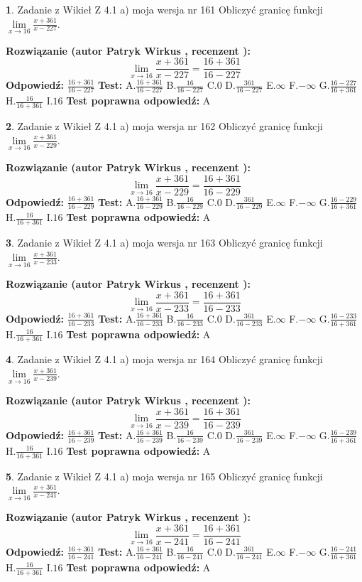 \documentclass[12pt, a4paper]{article}
\theoremstyle{definition} %
\newtheorem{zad}{}
\newcommand{\zadStart}[1]{\begin{zad}#1\newline}
\newcommand{\zadStop}{\end{zad}}
\newcommand{\rozwStart}[2]{\noindent \textbf{Rozwiązanie (autor #1 , recenzent #2): }\newline}
\newcommand{\rozwStop}{\newline}
\newcommand{\odpStart}{\noindent \textbf{Odpowiedź:}\newline}
\newcommand{\odpStop}{\newline}
\newcommand{\testStart}{\noindent \textbf{Test:}\newline}
\newcommand{\testStop}{\newline}
\newcommand{\kluczStart}{\noindent \textbf{Test poprawna odpowiedź:}\newline}
\newcommand{\kluczStop}{\newline}
\begin{document}
\zadStart{Zadanie z Wikieł Z 4.1 a) moja wersja nr 161}
Obliczyć granicę funkcji $\lim\limits_{x\to16}\frac{x+361}{x-227}$.
\zadStop
\rozwStart{Patryk Wirkus}{}
$$\lim\limits_{x\to16}\frac{x+361}{x-227} = \frac{16+361}{16-227}$$
\rozwStop
\odpStart
$\frac{16+361}{16-227}$
\odpStop
\testStart
A.$\frac{16+361}{16-227}$
B.$\frac{16}{16-227}$
C.$0$
D.$\frac{361}{16-227}$
E.$\infty$
F.$-\infty$
G.$\frac{16-227}{16+361}$
H.$\frac{16}{16+361}$
I.$16$
\testStop
\kluczStart
A
\kluczStop



\zadStart{Zadanie z Wikieł Z 4.1 a) moja wersja nr 162}
Obliczyć granicę funkcji $\lim\limits_{x\to16}\frac{x+361}{x-229}$.
\zadStop
\rozwStart{Patryk Wirkus}{}
$$\lim\limits_{x\to16}\frac{x+361}{x-229} = \frac{16+361}{16-229}$$
\rozwStop
\odpStart
$\frac{16+361}{16-229}$
\odpStop
\testStart
A.$\frac{16+361}{16-229}$
B.$\frac{16}{16-229}$
C.$0$
D.$\frac{361}{16-229}$
E.$\infty$
F.$-\infty$
G.$\frac{16-229}{16+361}$
H.$\frac{16}{16+361}$
I.$16$
\testStop
\kluczStart
A
\kluczStop



\zadStart{Zadanie z Wikieł Z 4.1 a) moja wersja nr 163}
Obliczyć granicę funkcji $\lim\limits_{x\to16}\frac{x+361}{x-233}$.
\zadStop
\rozwStart{Patryk Wirkus}{}
$$\lim\limits_{x\to16}\frac{x+361}{x-233} = \frac{16+361}{16-233}$$
\rozwStop
\odpStart
$\frac{16+361}{16-233}$
\odpStop
\testStart
A.$\frac{16+361}{16-233}$
B.$\frac{16}{16-233}$
C.$0$
D.$\frac{361}{16-233}$
E.$\infty$
F.$-\infty$
G.$\frac{16-233}{16+361}$
H.$\frac{16}{16+361}$
I.$16$
\testStop
\kluczStart
A
\kluczStop



\zadStart{Zadanie z Wikieł Z 4.1 a) moja wersja nr 164}
Obliczyć granicę funkcji $\lim\limits_{x\to16}\frac{x+361}{x-239}$.
\zadStop
\rozwStart{Patryk Wirkus}{}
$$\lim\limits_{x\to16}\frac{x+361}{x-239} = \frac{16+361}{16-239}$$
\rozwStop
\odpStart
$\frac{16+361}{16-239}$
\odpStop
\testStart
A.$\frac{16+361}{16-239}$
B.$\frac{16}{16-239}$
C.$0$
D.$\frac{361}{16-239}$
E.$\infty$
F.$-\infty$
G.$\frac{16-239}{16+361}$
H.$\frac{16}{16+361}$
I.$16$
\testStop
\kluczStart
A
\kluczStop



\zadStart{Zadanie z Wikieł Z 4.1 a) moja wersja nr 165}
Obliczyć granicę funkcji $\lim\limits_{x\to16}\frac{x+361}{x-241}$.
\zadStop
\rozwStart{Patryk Wirkus}{}
$$\lim\limits_{x\to16}\frac{x+361}{x-241} = \frac{16+361}{16-241}$$
\rozwStop
\odpStart
$\frac{16+361}{16-241}$
\odpStop
\testStart
A.$\frac{16+361}{16-241}$
B.$\frac{16}{16-241}$
C.$0$
D.$\frac{361}{16-241}$
E.$\infty$
F.$-\infty$
G.$\frac{16-241}{16+361}$
H.$\frac{16}{16+361}$
I.$16$
\testStop
\kluczStart
A
\kluczStop
\end{document}
